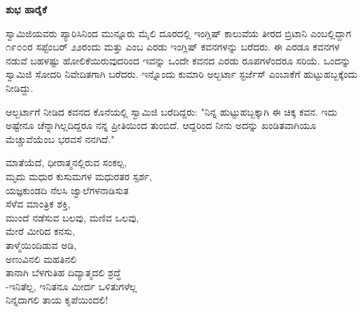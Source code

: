 \begin{myquote}
\end{myquote}

\begin{flushright}
\end{flushright}

\selectkan

\begin{center}
\textbf{ಶುಭ ಹಾರೈಕೆ}
\end{center}

ಸ್ವಾಮಿಜಿಯವರು ಪ್ಯಾರಿಸಿನಿಂದ ಮುನ್ನೂರು ಮೈಲಿ ದೂರದಲ್ಲಿ ಇಂಗ್ಲಿಷ್ ಕಾಲುವೆಯ ತೀರದ ಬ್ರಿಟಾನಿ ಎಂಬಲ್ಲಿದ್ದಾಗ ೧೯೦೦ರ ಸಪ್ಟೆಂಬರ್ ೨೨ರಂದು  ಮತ್ತು  ಎಂಬ ಎರಡು ಇಂಗ್ಲಿಷ್ ಕವನಗಳನ್ನು ಬರೆದರು. ಈ ಎರಡೂ ಕವನಗಳ ನಡುವೆ ಬಹಳಷ್ಟು ಹೋಲಿಕೆಯಿರುವುದರಿಂದ ಇವನ್ನು ಒಂದೇ ಕವನದ ಎರಡು ರೂಪಗಳೆಂದರೂ ಸರಿಯೆ. ಒಂದನ್ನು ಸ್ವಾಮಿಜಿ ಸೋದರಿ ನಿವೇದಿತಗಾಗಿ ಬರೆದರು. ಇನ್ನೊಂದು ಕುಮಾರಿ ಅಲ್ಬರ್ಟಾ ಸ್ಟರ್ಜೆಸ್ ಎಂಬಾಕೆಗೆ ಹುಟ್ಟುಹಬ್ಬಕ್ಕೆಂದು ನೀಡಿದ್ದು.

ಆಲ್ಬರ್ಟಾಗೆ ನೀಡಿದ ಕವನದ ಕೊನೆಯಲ್ಲಿ ಸ್ವಾಮಿಜಿ ಬರೆದಿದ್ದರು: "ನಿನ್ನ ಹುಟ್ಟುಹಬ್ಬಕ್ಕಾಗಿ ಈ ಚಿಕ್ಕ ಕವನ. ಇದು ಅಷ್ಟೇನೂ ಚೆನ್ನಾಗಿಲ್ಲದಿದ್ದರೂ ನನ್ನ ಪ್ರೀತಿಯಿಂದ ತುಂಬಿದೆ. ಆದ್ದರಿಂದ ನೀನು ಅದನ್ನು ಖಂಡಿತವಾಗಿಯೂ ಮೆಚ್ಚುವೆಯೆಂಬ ಭರವಸೆ ನನಗಿದೆ."

\begin{myquote}
ಮಾತೆಯೆದೆ, ಧೀರಾತ್ಮನಲ್ಲಿರುವ ಸಂಕಲ್ಪ,\\ಮೃದು ಮಧುರ ಕುಸುಮಗಳ ಮಧುರತರ ಸ್ಪರ್ಶ,\\ಯಜ್ಞಕುಂಡದಿ ನೆಲಸಿ ಜ್ವಾಲೆಗಳನಾಡಿಸುತ\\ಸೆಳೆವ ಮಾಂತ್ರಿಕ ಶಕ್ತಿ,\\ಮುಂದೆ ನಡೆಸುವ ಬಲವು, ಮಣಿವ ಒಲವು,\\ಮೇರೆ ಮೀರಿದ ಕನಸು,\\ತಾಳ್ಮೆಯಿಂದಿಡುವ ಅಡಿ,\\ಅಣುವಿನಲಿ ಮಹತಿನಲಿ\\ತಾನಾಗಿ ಬೆಳಗುತಿಹ ದಿವ್ಯಾತ್ಮದಲಿ ಶ್ರದ್ಧೆ\\-ಇನಿತೆಲ್ಲ, ಇನಿತನೂ ಮೀರ್ದ ಒಳಿತುಗಳೆಲ್ಲ\\ನಿನ್ನದಾಗಲಿ ತಾಯ ಕೃಪೆಯಿಂದಲಿ!
\end{myquote}

